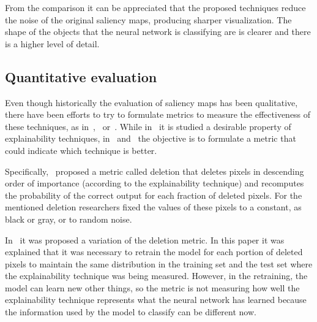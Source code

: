 \documentclass[preprint,12pt]{elsarticle}
\begin{document}
From the comparison it can be appreciated that the proposed techniques reduce the noise of the original saliency maps, producing sharper visualization. The shape of the objects that the neural network is classifying are is clearer and there is a higher level of detail.

\subsection{Quantitative evaluation}

Even though historically the evaluation of saliency maps has been qualitative, there have been efforts to try to formulate metrics to measure the effectiveness of these techniques, as in~\cite{Petsiuk2018},~\cite{Hooker2019} or~\cite{Ancona2018}. While in~\cite{Ancona2018} it is studied a desirable property of explainability techniques, in~\cite{Petsiuk2018} and~\cite{Hooker2019} the objective is to formulate a metric that could indicate which technique is better. 

Specifically,~\cite{Petsiuk2018} proposed a metric called deletion that deletes pixels in descending order of importance (according to the explainability technique) and recomputes the probability of the correct output for each fraction of deleted pixels. For the mentioned deletion researchers fixed the values of these pixels to a constant, as black or gray, or to random noise. 

In~\cite{Hooker2019} it was proposed a variation of the deletion metric. In this paper it was explained that it was necessary to retrain the model for each portion of deleted pixels to maintain the same distribution in the training set and the test set where the explainability technique was being measured. However, in the retraining, the model can learn new other things, so the metric is not measuring how well the explainability technique represents what the neural network has learned because the information used by the model to classify can be different now.
\end{document}
